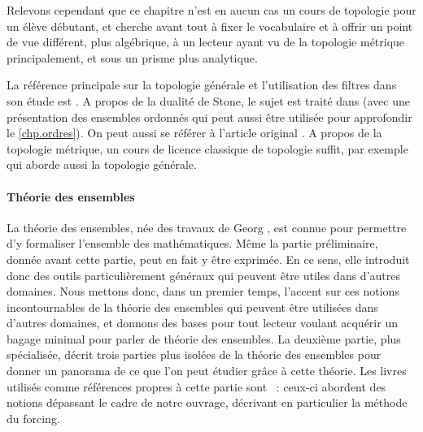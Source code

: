\begin{itemize}
  Relevons cependant que ce chapitre n'est en aucun cas un cours de topologie
  pour un élève débutant, et cherche avant tout à fixer le vocabulaire et à
  offrir un point de vue différent, plus algébrique, à un lecteur ayant vu de la
  topologie métrique principalement, et sous un prisme plus analytique.

  La référence principale sur la topologie générale et l'utilisation des filtres
  dans son étude est \cite{Bourbaki2007Topologie1}. A propos de la dualité de
  Stone, le sujet est traité dans \cite{AmadioCurien1998} (avec
  une présentation des ensembles ordonnés qui peut aussi être utilisée pour
  approfondir le \cref{chp.ordres}). On peut aussi se référer à l'article
  original \cite{Stone1936}. A propos de la topologie métrique, un cours de
  licence classique de topologie suffit, par exemple \cite{ElHageHassan2021}
  qui aborde aussi la topologie générale.
\end{itemize}

\paragraph{Théorie des ensembles}
La théorie des ensembles, née des travaux de Georg , est connue
pour permettre d'y formaliser l'ensemble des mathématiques. Même la partie
préliminaire, donnée avant cette partie, peut en fait y être exprimée. En ce
sens, elle introduit donc des outils particulièrement généraux qui peuvent être
utiles dans d'autres domaines. Nous mettons donc, dans un premier temps,
l'accent sur ces notions incontournables de la théorie des ensembles qui peuvent
être utilisées dans d'autres domaines, et donnons des bases pour tout lecteur
voulant acquérir un bagage minimal pour parler de théorie des ensembles. La
deuxième partie, plus spécialisée, décrit trois parties plus isolées de la
théorie des ensembles pour donner un panorama de ce que l'on peut étudier grâce
à cette théorie. Les livres utilisés comme références propres à cette partie
sont \cite{Krivine2007,Dehornoy2017,Kunen2011,Jech2003}~:
ceux-ci abordent des notions dépassant le cadre de notre ouvrage, décrivant en
particulier la méthode du forcing.

